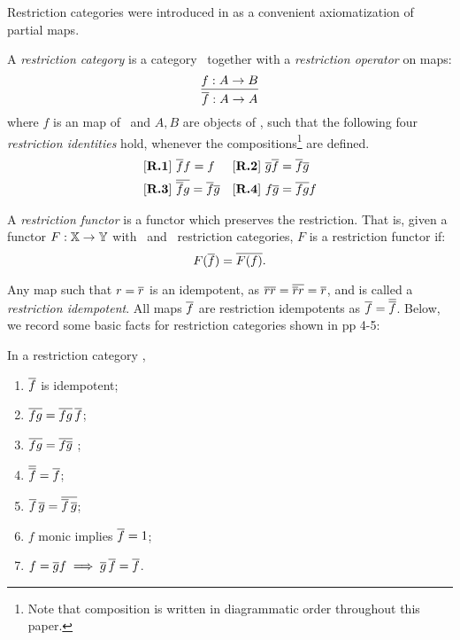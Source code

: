 Restriction categories were introduced in
 \cite{cockett2002:restcategories1} as a convenient axiomatization of partial maps.
\begin{definition}
  A \emph{restriction category} is a category \X\ together with a \emph{restriction operator} on
  maps:
  \[
    \infer{\restr{f}:A\to A}{f:A \to B}
  \]
  where $f$ is an map of \X\ and $A,B$ are objects of \X, such that the
  following four \emph{restriction identities} hold, whenever the
  compositions\footnote{Note that composition is
  written in diagrammatic order throughout this paper.} are defined.
  \begin{align*}
    &[\text{\bfseries {R}.{1}}]\ \overline{f} f = f & &
    [\text{\bfseries {R}.{2}}]\ \overline{g}  \overline{f} = \overline{f}  \overline{g}\\
    &[\text{\bfseries {R}.{3}}]\ \overline{\overline{f}  g} = \overline{f}   \overline{g} & &
    [\text{\bfseries {R}.{4}}]\  f \overline{g} = \overline{f g} f
  \end{align*}
\end{definition}

\begin{definition}
  A \emph{restriction functor} is a functor which preserves the restriction. That is,
  given a functor $F: \mathbb{X} \to \mathbb{Y}$ with \X\  and \Y\ restriction categories,
  $F$ is a restriction functor if:
  \[ 
    F(\overline{f}) = \overline{F(f)}.
  \]
\end{definition}

Any map such that $r=\overline{r}$ is an idempotent, as $\overline{r}\overline{r} = \overline{\overline{r} r} = \overline{r}$,
and is called a \emph{restriction idempotent}. All maps $\overline{f}$ are restriction idempotents as
$\overline{f}=\overline{\overline{f}}$. Below, we record some basic facts for restriction categories
shown in \cite{cockett2002:restcategories1} pp 4-5:
\begin{lemma}\label{lem:identities_involving_restriction}
  In a restriction category \X,
  \begin{multicols}{2}
    \begin{enumerate}[{(}i{)}]
      \item{}$\overline{f}$ is idempotent;
      \item{} $\overline{f g} = \overline{f g} \, \overline{f}$;\label{lemsub:restriction_identities_two}
      \item{} $\overline{f g} = \overline{f \overline{g}}$ ;
      \item{} $\overline{\overline{f}} = \overline{f}$;
      \item{} $\overline{f}\,\overline{g} = \overline{\overline{f}\,\overline{g}}$;
      \item{} $f$ monic implies $\overline{f} = 1$;
      \item{} $f = \overline{g} f \implies \overline{g}\,\overline{f} = \overline{f}$.
      \\
    \end{enumerate}
  \end{multicols}
\end{lemma}

